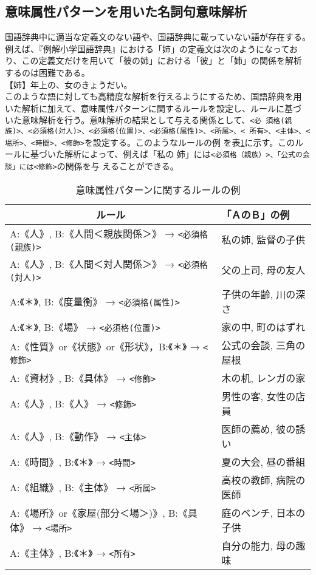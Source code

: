 \documentclass{nlp}
\begin{document}
  \subsection{意味属性パターンを用いた名詞句意味解析}
  
  国語辞典中に適当な定義文のない語や、国語辞典に載っていない語が存在する。
  例えば、『例解小学国語辞典』における「姉」の定義文は次のようになってお
  り、この定義文だけを用いて「彼の姉」における「彼」と「姉」の関係を解析
  するのは困難である。
  \vspace{1.5ex}\\
  \hspace{1em}【姉】年上の、女のきょうだい。 
  \vspace{1.5ex}\\  
  このような語に対しても高精度な解析を行えるようにするため、国語辞典を用
  いた解析に加えて、意味属性パターンに関するルールを設定し、ルールに基づ
  いた意味解析を行う。意味解析の結果として与える関係として、\texttt{<必
  須格(親族)>、<必須格(対人)>、<必須格(位置)>、<必須格(属性)>、<所属>、<
  所有>、<主体>、<場所>、<時間>、<修飾>}を設定する。このようなルールの例
  を表\ref{RuleEx}に示す。このルールに基づいた解析によって、例えば「私の
  姉」には\texttt{<必須格（親族）>、「公式の会談」には<修飾>}の関係を与
  えることができる。

  \begin{table}
   \small
   \caption{意味属性パターンに関するルールの例}
   \label{RuleEx}
   \begin{center}
    \begin{tabular}{ll}\hline 
     \multicolumn{1}{c}{ルール} & 「ＡのＢ」の例\\\hline
     A:《人》, B:《人間＜親族関係＞》 → \texttt{<必須格(親族)>}
     & 私の姉, 監督の子供\\
     A:《人》, B:《人間＜対人関係＞》 → \texttt{<必須格(対人)>}
     & 父の上司, 母の友人\\
     A:《＊》,  B:《度量衡》 → \texttt{<必須格(属性)>}
     & 子供の年齢, 川の深さ\\
     A:《＊》, B:《場》 → \texttt{<必須格(位置)>}
     & 家の中, 町のはずれ\\
     A:《性質》or《状態》or《形状》，B:《＊》 → \texttt{<修飾>}
     & 公式の会談, 三角の屋根\\
     A:《資材》, B:《具体》 → \texttt{<修飾>}
     & 木の机, レンガの家\\
     A:《人》, B:《人》 → \texttt{<修飾>}
     & 男性の客, 女性の店員\\
     A:《人》, B:《動作》 → \texttt{<主体>}
     & 医師の薦め, 彼の誘い\\
     A:《時間》, B:《＊》 → \texttt{<時間>}
     & 夏の大会, 昼の番組\\
     A:《組織》, B:《主体》 → \texttt{<所属>}
     & 高校の教師, 病院の医師\\
     A:《場所》or《家屋(部分＜場＞)》, B:《具体》 → \texttt{<場所>}
     & 庭のベンチ, 日本の子供\\
     A:《主体》, B:《＊》 → \texttt{<所有>}
     & 自分の能力, 母の趣味\\\hline
    \end{tabular}
   \end{center}
  \end{table}
\end{document}
